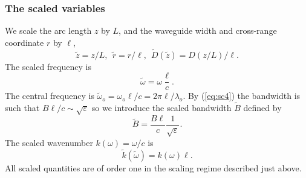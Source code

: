 \documentclass[final]{siamltex}
\begin{document}
\subsubsection{The scaled variables}
We scale the arc length $z$ by $L$, and the waveguide width and
cross-range coordinate $r$ by $\ell$, 
\begin{equation}
\tilde z = z/L, ~ ~ \tilde r = r/\ell, ~ ~ \tilde D(\tilde z) =
D(z/L)/\ell.
\label{eq:sc5}
\end{equation}
The scaled frequency is
\begin{equation}
\tilde {\omega} = {\omega} \frac{\ell}{c} .
\label{eq:sc6}
\end{equation}
The central frequency is $\tilde{\omega}_o = {\omega}_o \ell / c =2 \pi \ell /\lambda_o$.
By (\ref{eq:sc4}) the bandwidth is such that $B \ell /c \sim \sqrt{\varepsilon}$ so we introduce the scaled bandwidth $\tilde{B}$
defined by 
\begin{equation}
\tilde{B} = \frac{B \ell}{c} \frac{1}{\sqrt{\varepsilon}} .
\end{equation}
The scaled wavenumber $k({\omega}) = {\omega}/c$ is
\begin{equation}
\tilde k(\tilde{\omega}) = k({\omega}) \ell .
\end{equation} 
All scaled quantities are of order one in the scaling regime described just above.
\end{document}
